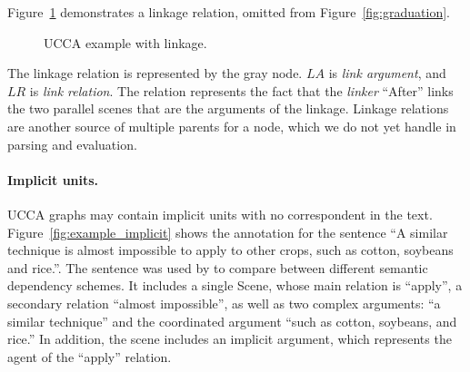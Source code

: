 \documentclass[11pt,a4paper]{article}
\newcommand{\figref}[1]{Figure~\ref{#1}}
\begin{document}
\figref{fig:example_linkage} demonstrates a linkage relation, omitted from \figref{fig:graduation}.

\begin{figure}[H]
  \centering
  \caption{UCCA example with linkage.}
  \label{fig:example_linkage}
\end{figure}

The linkage relation is represented by the gray node.
$LA$ is \emph{link argument}, and $LR$ is \emph{link relation}.
The relation represents the fact that the \emph{linker} ``After'' links the two parallel scenes
that are the arguments of the linkage.
Linkage relations are another source of multiple parents for a node, which we do not yet handle
in parsing and evaluation.

\paragraph{Implicit units.}

UCCA graphs may contain implicit units with no correspondent in the text.
\figref{fig:example_implicit} shows the annotation for the sentence
``A similar technique is almost impossible to apply to other crops, such as cotton, soybeans and rice.''.
The sentence was used by \cite{oepen2015semeval} to compare between different semantic
dependency schemes.
It includes a single Scene, whose main relation is ``apply'', a secondary relation ``almost impossible'', as well as two complex arguments: ``a similar technique'' and the coordinated argument ``such as cotton, soybeans, and rice.''
In addition, the scene includes an implicit argument, which represents the agent of the
``apply'' relation.
\end{document}
